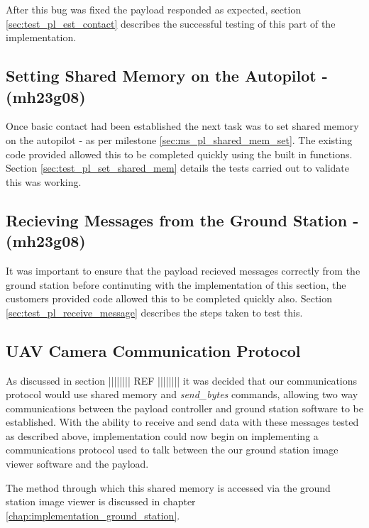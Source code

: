 After this bug was fixed the payload responded as expected, 
section \ref{sec:test_pl_est_contact} describes the successful testing of this part of
the implementation.

\subsection{Setting Shared Memory on the Autopilot - (mh23g08)}
Once basic contact had been established the next task was to set shared memory on
the autopilot - as per milestone \ref{sec:ms_pl_shared_mem_set}. The existing code
provided allowed this to be completed quickly using the built in functions. Section 
\ref{sec:test_pl_set_shared_mem} details the tests carried out to validate this
was working.

\subsection{Recieving Messages from the Ground Station - (mh23g08)}
It was important to ensure that the payload recieved messages correctly from the ground
station before continuting with the implementation of this section, the customers provided code
allowed this to be completed quickly also. Section \ref{sec:test_pl_receive_message} describes 
the steps taken to test this.

\subsection{UAV Camera Communication Protocol}
As discussed in section |||||||| REF |||||||| it was decided that 
our communications protocol would use shared memory and \emph{send\_bytes} 
commands, allowing two way communications between the payload controller and 
ground station software to be established. With the ability to receive and send data
with these messages tested as described above, implementation could now begin on
implementing a communications protocol used to talk between the our ground station 
image viewer software and the payload.

The method through which this shared memory is accessed via the ground station
image viewer is discussed in chapter \ref{chap:implementation_ground_station}.


